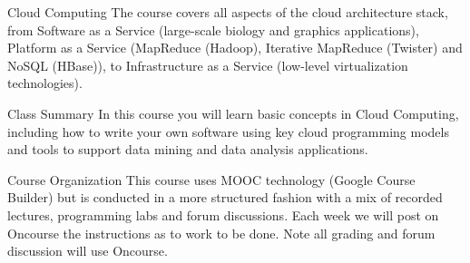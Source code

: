 Cloud Computing
The course covers all aspects of the cloud architecture stack, from Software as a Service (large-scale biology and graphics applications), Platform as a Service (MapReduce (Hadoop), Iterative MapReduce (Twister) and NoSQL (HBase)), to Infrastructure as a Service (low-level virtualization technologies).

Class Summary
In this course you will learn basic concepts in Cloud Computing, including how to write your own software using key cloud programming models and tools to support data mining and data analysis applications.

Course Organization
This course uses MOOC technology (Google Course Builder) but is conducted in a more structured fashion with a mix of recorded lectures, programming labs and forum discussions. Each week we will post on Oncourse the instructions as to work to be done. Note all grading and forum discussion will use Oncourse.

